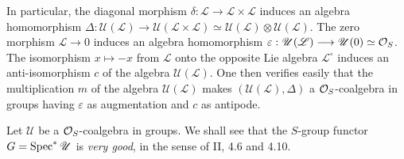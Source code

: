 In particular, the diagonal morphism $\delta:\mathscr L\to\mathscr L\times\mathscr L$ induces an algebra homomorphism $\Delta:\mathscr U(\mathscr L)\to\mathscr U(\mathscr L\times\mathscr L)\simeq\mathscr U(\mathscr L)\otimes\mathscr U(\mathscr L)$. The zero morphism $\mathscr L\to0$ induces an algebra homomorphism $\varepsilon:\mathscr U(\mathscr L)\longrightarrow\mathscr U(0)\simeq\mathcal{O}_S$. The isomorphism $x\mapsto-x$ from $\mathscr L$ onto the opposite Lie algebra $\mathscr L^\circ$ induces an anti-isomorphism $c$ of the algebra $\mathscr U(\mathscr L)$. One then verifies easily that the multiplication $m$ of the algebra $\mathscr U(\mathscr L)$ makes $(\mathscr U(\mathscr L),\Delta)$ a $\mathcal{O}_S$-coalgebra in groups having $\varepsilon$ as augmentation and $c$ as antipode.

Let $\mathscr U$ be a $\mathcal{O}_S$-coalgebra in groups. We shall see that the $S$-group functor $G=\operatorname{Spec}^*\mathscr U$ is \emph{very good}, in the sense of II, 4.6 and 4.10.


